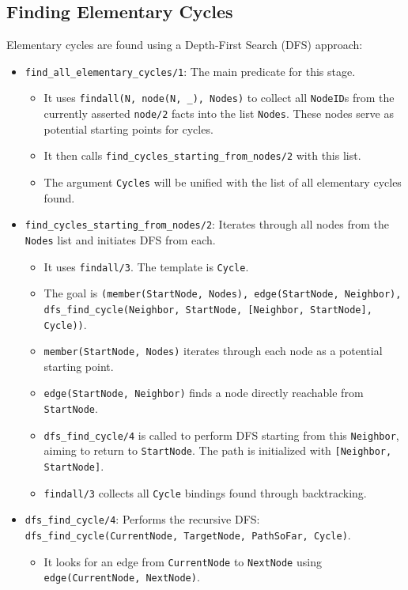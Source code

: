 \documentclass[12pt,a4paper]{article}
\begin{document}
\subsection{Finding Elementary Cycles}
Elementary cycles are found using a Depth-First Search (DFS) approach:
\begin{itemize}
\item \texttt{find\_all\_elementary\_cycles/1}: The main predicate for this stage.
\begin{itemize}
\item It uses \texttt{findall(N, node(N, \_), Nodes)} to collect all \texttt{NodeID}s from the currently asserted \texttt{node/2} facts into the list \texttt{Nodes}. These nodes serve as potential starting points for cycles.
\item It then calls \texttt{find\_cycles\_starting\_from\_nodes/2} with this list.
\item The argument \texttt{Cycles} will be unified with the list of all elementary cycles found.
\end{itemize}
\item \texttt{find\_cycles\_starting\_from\_nodes/2}: Iterates through all nodes from the \texttt{Nodes} list and initiates DFS from each.
\begin{itemize}
\item It uses \texttt{findall/3}. The template is \texttt{Cycle}.
\item The goal is \texttt{(member(StartNode, Nodes), edge(StartNode, Neighbor), dfs\_find\_cycle(Neighbor, StartNode, [Neighbor, StartNode], Cycle))}.
\item \texttt{member(StartNode, Nodes)} iterates through each node as a potential starting point.
\item \texttt{edge(StartNode, Neighbor)} finds a node directly reachable from \texttt{StartNode}.
\item \texttt{dfs\_find\_cycle/4} is called to perform DFS starting from this \texttt{Neighbor}, aiming to return to \texttt{StartNode}. The path is initialized with \texttt{[Neighbor, StartNode]}.
\item \texttt{findall/3} collects all \texttt{Cycle} bindings found through backtracking.
\end{itemize}
\item \texttt{dfs\_find\_cycle/4}: Performs the recursive DFS: \texttt{dfs\_find\_cycle(CurrentNode, TargetNode, PathSoFar, Cycle)}.
\begin{itemize}
\item It looks for an edge from \texttt{CurrentNode} to \texttt{NextNode} using \texttt{edge(CurrentNode, NextNode)}.

\end{itemize}
\end{itemize}
\end{document}
